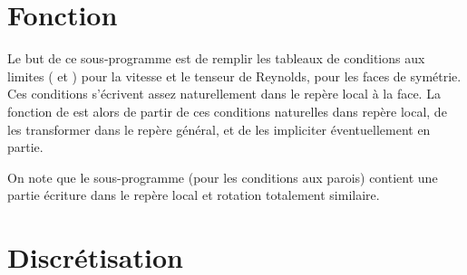 %
%
%
%
%
%
%
%


\vspace{1cm}
\section{Fonction}
Le but de ce sous-programme est de remplir les tableaux de conditions aux
limites ( et ) pour la vitesse et le tenseur de Reynolds,
pour les faces de sym\'etrie. Ces conditions s'\'ecrivent assez
naturellement dans le rep\`ere local \`a la face. La fonction de 
est alors de partir de ces conditions naturelles dans rep\`ere local, de les
transformer dans le rep\`ere g\'en\'eral, et de les impliciter \'eventuellement
en partie.

On note que le sous-programme  (pour les conditions aux parois)
contient une partie \'ecriture dans
le rep\`ere local et rotation totalement similaire.

\section{Discr\'etisation}

